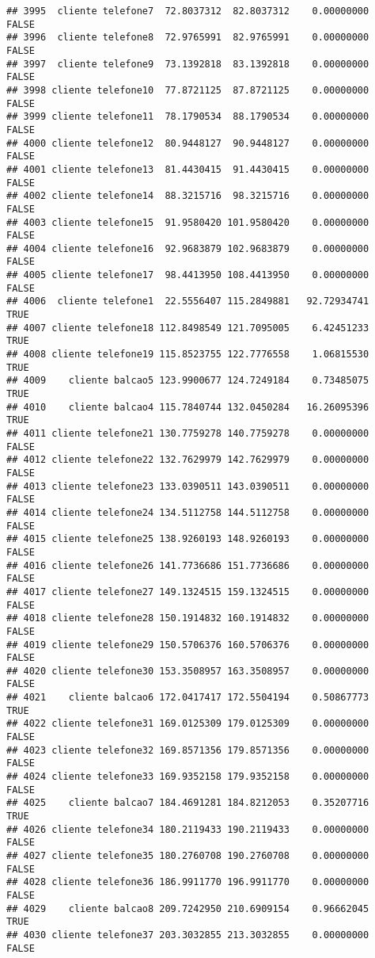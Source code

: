 \documentclass[
]{article}
\begin{document}
\begin{verbatim}
## 3995  cliente telefone7  72.8037312  82.8037312    0.00000000    FALSE
## 3996  cliente telefone8  72.9765991  82.9765991    0.00000000    FALSE
## 3997  cliente telefone9  73.1392818  83.1392818    0.00000000    FALSE
## 3998 cliente telefone10  77.8721125  87.8721125    0.00000000    FALSE
## 3999 cliente telefone11  78.1790534  88.1790534    0.00000000    FALSE
## 4000 cliente telefone12  80.9448127  90.9448127    0.00000000    FALSE
## 4001 cliente telefone13  81.4430415  91.4430415    0.00000000    FALSE
## 4002 cliente telefone14  88.3215716  98.3215716    0.00000000    FALSE
## 4003 cliente telefone15  91.9580420 101.9580420    0.00000000    FALSE
## 4004 cliente telefone16  92.9683879 102.9683879    0.00000000    FALSE
## 4005 cliente telefone17  98.4413950 108.4413950    0.00000000    FALSE
## 4006  cliente telefone1  22.5556407 115.2849881   92.72934741     TRUE
## 4007 cliente telefone18 112.8498549 121.7095005    6.42451233     TRUE
## 4008 cliente telefone19 115.8523755 122.7776558    1.06815530     TRUE
## 4009    cliente balcao5 123.9900677 124.7249184    0.73485075     TRUE
## 4010    cliente balcao4 115.7840744 132.0450284   16.26095396     TRUE
## 4011 cliente telefone21 130.7759278 140.7759278    0.00000000    FALSE
## 4012 cliente telefone22 132.7629979 142.7629979    0.00000000    FALSE
## 4013 cliente telefone23 133.0390511 143.0390511    0.00000000    FALSE
## 4014 cliente telefone24 134.5112758 144.5112758    0.00000000    FALSE
## 4015 cliente telefone25 138.9260193 148.9260193    0.00000000    FALSE
## 4016 cliente telefone26 141.7736686 151.7736686    0.00000000    FALSE
## 4017 cliente telefone27 149.1324515 159.1324515    0.00000000    FALSE
## 4018 cliente telefone28 150.1914832 160.1914832    0.00000000    FALSE
## 4019 cliente telefone29 150.5706376 160.5706376    0.00000000    FALSE
## 4020 cliente telefone30 153.3508957 163.3508957    0.00000000    FALSE
## 4021    cliente balcao6 172.0417417 172.5504194    0.50867773     TRUE
## 4022 cliente telefone31 169.0125309 179.0125309    0.00000000    FALSE
## 4023 cliente telefone32 169.8571356 179.8571356    0.00000000    FALSE
## 4024 cliente telefone33 169.9352158 179.9352158    0.00000000    FALSE
## 4025    cliente balcao7 184.4691281 184.8212053    0.35207716     TRUE
## 4026 cliente telefone34 180.2119433 190.2119433    0.00000000    FALSE
## 4027 cliente telefone35 180.2760708 190.2760708    0.00000000    FALSE
## 4028 cliente telefone36 186.9911770 196.9911770    0.00000000    FALSE
## 4029    cliente balcao8 209.7242950 210.6909154    0.96662045     TRUE
## 4030 cliente telefone37 203.3032855 213.3032855    0.00000000    FALSE

\end{verbatim}
\end{document}
